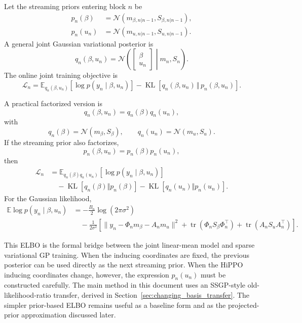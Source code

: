 \documentclass[12pt]{article}
\newcommand{\E}{\mathbb{E}}
\newcommand{\KL}{\operatorname{KL}}
\newcommand{\tr}{\operatorname{tr}}
\begin{document}
Let the streaming priors entering block $n$ be
\begin{align}
p_n(\beta)
&=
\mathcal{N}
\left(
m_{\beta,n|n-1},
S_{\beta,n|n-1}
\right),
\\
p_n(u_n)
&=
\mathcal{N}
\left(
m_{u,n|n-1},
S_{u,n|n-1}
\right).
\end{align}
A general joint Gaussian variational posterior is
\begin{equation}
q_n(\beta,u_n)
=
\mathcal{N}
\left(
\begin{bmatrix}\beta\\ u_n\end{bmatrix}
\middle|
m_n,S_n
\right).
\label{eq:joint-posterior}
\end{equation}
The online joint training objective is
\begin{equation}
\mathcal{L}_n
=
\E_{q_n(\beta,u_n)}
\left[
\log p(y_n\mid \beta,u_n)
\right]
-
\KL\!\left[
q_n(\beta,u_n)
\,\Vert\,
p_n(\beta,u_n)
\right].
\label{eq:online-joint-elbo}
\end{equation}

A practical factorized version is
\begin{equation}
q_n(\beta,u_n)
=
q_n(\beta)q_n(u_n),
\end{equation}
with
\begin{equation}
q_n(\beta)=\mathcal{N}(m_\beta,S_\beta),
\qquad
q_n(u_n)=\mathcal{N}(m_u,S_u).
\end{equation}
If the streaming prior also factorizes,
\begin{equation}
p_n(\beta,u_n)=p_n(\beta)p_n(u_n),
\end{equation}
then
\begin{align}
\mathcal{L}_n
&=
\E_{q_n(\beta)q_n(u_n)}
\left[
\log p(y_n\mid \beta,u_n)
\right]
\\
&\quad
-
\KL[q_n(\beta)\Vert p_n(\beta)]
-
\KL[q_n(u_n)\Vert p_n(u_n)].
\label{eq:mean-field-elbo}
\end{align}
For the Gaussian likelihood,
\begin{align}
\E\log p(y_n\mid \beta,u_n)
&=
-\frac{B_n}{2}\log(2\pi\sigma^2)
\\
&\quad
-\frac{1}{2\sigma^2}
\left[
\|y_n-\Phi_nm_\beta-A_nm_u\|^2
+
\tr(\Phi_nS_\beta\Phi_n^\top)
+
\tr(A_nS_uA_n^\top)
\right].
\label{eq:expected-log-likelihood}
\end{align}

This ELBO is the formal bridge between the joint linear-mean model and sparse
variational GP training. When the inducing coordinates are fixed, the previous posterior
can be used directly as the next streaming prior. When the HiPPO inducing coordinates
change, however, the expression \(p_n(u_n)\) must be constructed carefully. The main
method in this document uses an SSGP-style old-likelihood-ratio transfer, derived in
Section~\ref{sec:changing_basis_transfer}. The simpler prior-based ELBO remains useful
as a baseline form and as the projected-prior approximation discussed later.
\end{document}
